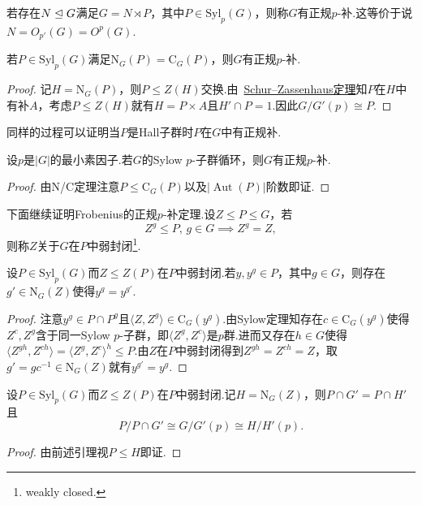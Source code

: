 若存在$N\trianglelefteq G$满足$G=N\rtimes P$，其中$P\in\mathrm{Syl}_p(G)$，则称$G$有{\heiti 正规$p$-补}.这等价于说$N=O_{p'}(G)=O^p(G)$.
\begin{thm}[(Burnside)]
	若$P\in\mathrm{Syl}_p(G)$满足$\mathrm{N}_G(P)=\mathrm{C}_G(P)$，则$G$有正规$p$-补.\hypertarget{thm:BurnsideNormalpComplement}{}
\end{thm}
\begin{proof}
	记$H=\mathrm{N}_G(P)$，则$P\le Z(H)$交换.由~\hyperlink{thm:SchurZassenhaus}{Schur--Zassenhaus定理}知$P$在$H$中有补$A$，考虑$P\le Z(H)$就有$H=P\times A$且$H'\cap P=1$.因此$G/G'(p)\cong P$.
\end{proof}
\begin{remark}
	同样的过程可以证明当$P$是Hall子群时$P$在$G$中有正规补.
\end{remark}
\begin{cor*}
	设$p$是$|G|$的最小素因子.若$G$的Sylow $p$-子群循环，则$G$有正规$p$-补.
\end{cor*}
\begin{proof}
	由N/C定理注意$P\le\mathrm{C}_G(P)$以及$|\operatorname*{Aut}(P)|$阶数即证.
\end{proof}

下面继续证明Frobenius的正规$p$-补定理.设$Z\le P\le G$，若
\[
	Z^g\le P,\,g\in G\implies Z^g=Z,
\]
则称$Z$关于$G$在$P$中{\heiti 弱封闭}\footnote{weakly closed.}.
\begin{lemma*}
	设$P\in\mathrm{Syl}_p(G)$而$Z\le Z(P)$在$P$中弱封闭.若$y,y^g\in P$，其中$g\in G$，则存在$g'\in\mathrm{N}_G(Z)$使得$y^g=y^{g'}$.
\end{lemma*}
\begin{proof}
	注意$y^g\in P\cap P^g$且$\langle Z,Z^g\rangle\in\mathrm{C}_G(y^g)$.由Sylow定理知存在$c\in\mathrm{C}_G(y^g)$使得$Z^c,Z^g$含于同一Sylow $p$-子群，即$\langle Z^g,Z^c\rangle $是$p$群.进而又存在$h\in G$使得$\langle Z^{gh},Z^{ch}\rangle=\langle Z^g,Z^c\rangle^h\le P$.由$Z$在$P$中弱封闭得到$Z^{gh}=Z^{ch}=Z$，取$g'=gc^{-1}\in\mathrm{N}_G(Z)$就有$y^{g'}=y^g$.
\end{proof}
\begin{thm}[(Gr\"un)]
	设$P\in\mathrm{Syl}_p(G)$而$Z\le Z(P)$在$P$中弱封闭.记$H=\mathrm{N}_G(Z)$，则$P\cap G'=P\cap H'$且
	\[
		P/P\cap G'\cong G/G'(p)\cong H/H'(p).
	\]
\end{thm}
\begin{proof}
	由前述引理视$P\le H$即证.
\end{proof}

